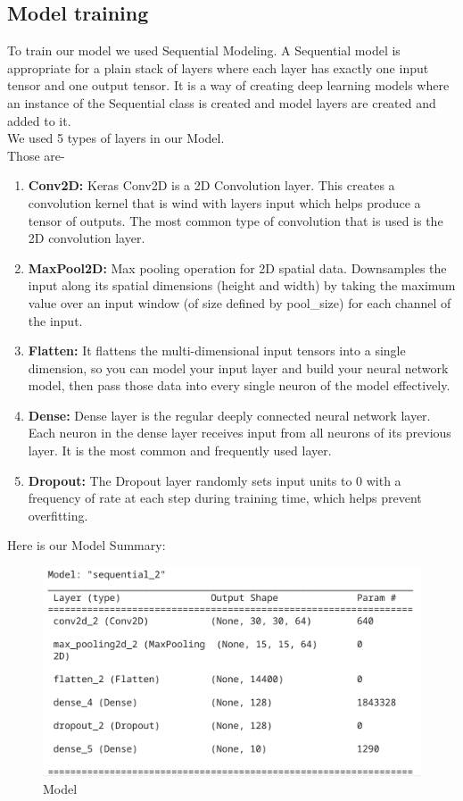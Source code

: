\documentclass[conference]{IEEEtran}
\begin{document}
\subsection{Model training}

To train our model we used Sequential Modeling. A Sequential model is appropriate for a plain stack of layers where each layer has exactly one input tensor and one output tensor. It is a way of creating deep learning models where an instance of the Sequential class is created and model layers are created and added to it.\\

We used 5 types of layers in our Model.\\Those are-

\begin{enumerate}
  \item \textbf{Conv2D:} Keras Conv2D is a 2D Convolution layer. This creates a convolution kernel that is wind with layers input which helps produce a tensor of outputs. The most common type of convolution that is used is the 2D convolution layer.
  \item \textbf{MaxPool2D:} Max pooling operation for 2D spatial data. Downsamples the input along its spatial dimensions (height and width) by taking the maximum value over an input window (of size defined by pool\_size) for each channel of the input.
  \item \textbf{Flatten:} It flattens the multi-dimensional input tensors into a single dimension, so you can model your input layer and build your neural network model, then pass those data into every single neuron of the model effectively.
  \item \textbf{Dense:} Dense layer is the regular deeply connected neural network layer. Each neuron in the dense layer receives input from all neurons of its previous layer. It is the most common and frequently used layer.
  \item \textbf{Dropout:} The Dropout layer randomly sets input units to 0 with a frequency of rate at each step during training time, which helps prevent overfitting.
\end{enumerate}

Here is our Model Summary:
\begin{figure}[htbp]
\centerline{\includegraphics[scale=.3]{fig4.png}}
\caption{Model}
\label{fig4}
\end{figure}
\end{document}
